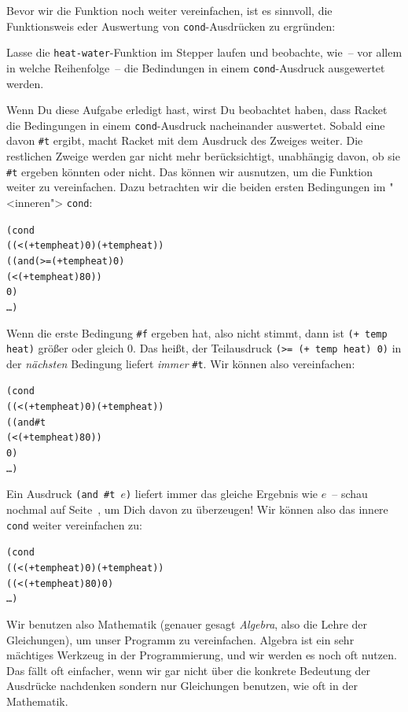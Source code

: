 Bevor wir die Funktion noch weiter vereinfachen, ist es sinnvoll, die
Funktionsweis eder Auswertung von \texttt{cond}-Ausdrücken zu ergründen:
%
\begin{aufgabe}
  Lasse die \texttt{heat-water}-Funktion im Stepper laufen und
  beobachte, wie~-- vor allem in welche Reihenfolge~-- die Bedindungen
  in einem \texttt{cond}-Ausdruck ausgewertet werden.
\end{aufgabe}
%
Wenn Du diese Aufgabe erledigt hast, wirst Du beobachtet haben, dass Racket
die Bedingungen in einem \texttt{cond}-Ausdruck nacheinander
auswertet.  Sobald eine davon \verb|#t| ergibt, macht Racket mit dem
Ausdruck des Zweiges weiter.  Die restlichen Zweige werden gar nicht
mehr berücksichtigt, unabhängig davon, ob sie \verb|#t| ergeben
könnten oder nicht.
Das können wir ausnutzen, um die Funktion weiter zu vereinfachen.
Dazu betrachten wir die beiden ersten Bedingungen im "<inneren">
\texttt{cond}:
%
\begin{alltt}
       (cond
         ((< (+ temp heat) 0) (+ temp heat))
         ((and (>= (+ temp heat) 0)
               (< (+ temp heat) 80))
          0)
         \ldots)
\end{alltt}
%
Wenn die erste Bedingung \verb|#f| ergeben hat, also nicht stimmt,
dann ist \texttt{(+ temp heat)} größer oder gleich 0.  Das heißt, der
Teilausdruck \texttt{(>= (+ temp heat) 0)} in der \emph{nächsten}
Bedingung liefert \emph{immer} \verb|#t|.  Wir können also
vereinfachen:
%
\begin{alltt}
       (cond
         ((< (+ temp heat) 0) (+ temp heat))
         ((and #t
               (< (+ temp heat) 80))
          0)
         \ldots)
\end{alltt}
%
Ein Ausdruck \texttt{(and \#t \(e\))} liefert immer das gleiche Ergebnis
wie \(e\)~-- schau nochmal auf Seite~\pageref{page:and}, um Dich davon
zu überzeugen!  Wir können also das innere \texttt{cond} weiter
vereinfachen zu:
%
\begin{alltt}
       (cond
         ((< (+ temp heat) 0) (+ temp heat))
         ((< (+ temp heat) 80) 0)
         \ldots)
\end{alltt}
%
Wir benutzen also Mathematik (genauer gesagt
\textit{Algebra}, also die Lehre der Gleichungen), um
unser Programm zu vereinfachen.  Algebra ist ein sehr mächtiges
Werkzeug in der Programmierung, und wir werden es noch oft nutzen.
Das fällt oft einfacher, wenn wir gar nicht über die konkrete
Bedeutung der Ausdrücke nachdenken sondern nur Gleichungen benutzen,
wie oft in der Mathematik.


